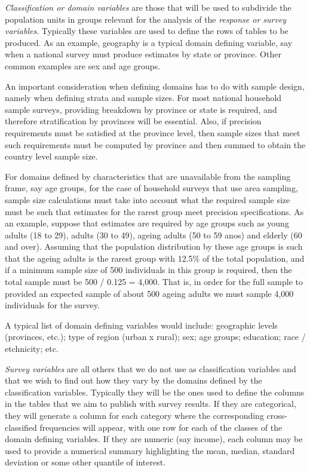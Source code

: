 \documentclass[
  12pt,
]{book}
\begin{document}
\emph{Classification or domain variables} are those that will be used to subdivide the population units in groups relevant for the analysis of the \emph{response or survey variables}. Typically these variables are used to define the rows of tables to be produced. As an example, geography is a typical domain defining variable, say when a national survey must produce estimates by state or province. Other common examples are sex and age groups.

An important consideration when defining domains has to do with sample design, namely when defining strata and sample sizes. For most national household sample surveys, providing breakdown by province or state is required, and therefore stratification by provinces will be essential. Also, if precision requirements must be satisfied at the province level, then sample sizes that meet such requirements must be computed by province and then summed to obtain the country level sample size.

For domains defined by characteristics that are unavailable from the sampling frame, say age groups, for the case of household surveys that use area sampling, sample size calculations must take into account what the required sample size must be such that estimates for the rarest group meet precision specifications. As an example, suppose that estimates are required by age groups such as young adults (18 to 29), adults (30 to 49), ageing adults (50 to 59 anos) and elderly (60 and over). Assuming that the population distribution by these age groups is such that the ageing adults is the rarest group with 12.5\% of the total population, and if a minimum sample size of 500 individuals in this group is required, then the total sample must be 500 / 0.125 = 4,000. That is, in order for the full sample to provided an expected sample of about 500 ageing adults we must sample 4,000 individuals for the survey.

A typical list of domain defining variables would include: geographic levels (provinces, etc.); type of region (urban x rural); sex; age groups; education; race / etchnicity; etc.

\emph{Survey variables} are all others that we do not use as classification variables and that we wish to find out how they vary by the domains defined by the classification variables. Typically they will be the ones used to define the columns in the tables that we aim to publish with survey results. If they are categorical, they will generate a column for each category where the corresponding cross-classified frequencies will appear, with one row for each of the classes of the domain defining variables. If they are numeric (say income), each column may be used to provide a numerical summary highlighting the mean, median, standard deviation or some other quantile of interest.
\end{document}
